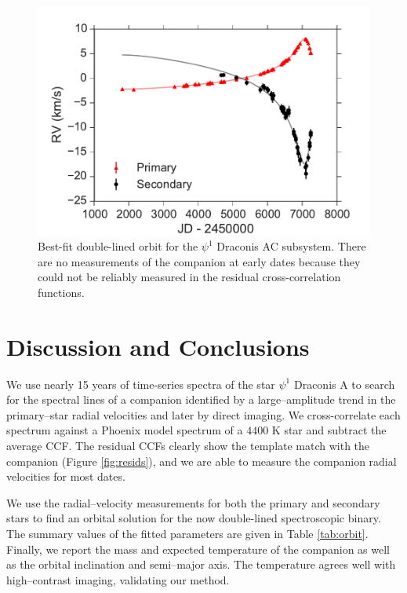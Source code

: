 \begin{figure}

  \includegraphics[width=\columnwidth]{Figures/paper4_SB2_Orbit.pdf}
  \caption{Best-fit double-lined orbit for the $\psi^1$ Draconis AC subsystem. There are no measurements of the companion at early dates because they could not be reliably measured in the residual cross-correlation functions.}
  \label{fig:orbit}
  
\end{figure}



\section{Discussion and Conclusions}

We use nearly 15 years of time-series spectra of the star $\psi^1$ Draconis A to search for the spectral lines of a companion identified by a large--amplitude trend in the primary--star radial velocities and later by direct imaging. We cross-correlate each spectrum against a Phoenix model spectrum of a $4400$ K star and subtract the average CCF. The residual CCFs clearly show the template match with the companion (Figure \ref{fig:resids}), and we are able to measure the companion radial velocities for most dates. 

We use the radial--velocity measurements for both the primary and secondary stars to find an orbital solution for the now double-lined spectroscopic binary. The summary values of the fitted parameters are given in Table \ref{tab:orbit}. Finally, we report the mass and expected temperature of the companion as well as the orbital inclination and semi--major axis. The temperature agrees well with high--contrast imaging, validating our method.

